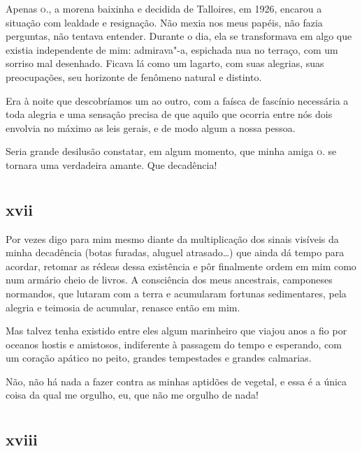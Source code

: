 Apenas \textsc{o.}, a morena baixinha e decidida de Talloires, em 1926, encarou a
situação com lealdade e resignação. Não mexia nos meus papéis, não fazia
perguntas, não tentava entender. Durante o dia, ela se transformava em
algo que existia independente de mim: admirava"-a, espichada nua no
terraço, com um sorriso mal desenhado. Ficava lá como um lagarto, com
suas alegrias, suas preocupações, seu horizonte de fenômeno natural e
distinto.

Era à noite que descobríamos um ao outro, com a faísca de fascínio
necessária a toda alegria e uma sensação precisa de que aquilo que
ocorria entre nós dois envolvia no máximo as leis gerais, e de modo
algum a nossa pessoa.

Seria grande desilusão constatar, em algum momento, que minha amiga
\textsc{o.} se tornara uma verdadeira amante. Que decadência!

\chapter*{}
\section{xvii}

\noindent{}Por vezes digo para mim mesmo diante da multiplicação dos
sinais visíveis da minha decadência (botas furadas, aluguel
atrasado\ldots{}) que ainda dá tempo para acordar, retomar as rédeas
dessa existência e pôr finalmente ordem em mim como num armário cheio de
livros. A consciência dos meus ancestrais, camponeses normandos, que
lutaram com a terra e acumularam fortunas sedimentares, pela alegria e
teimosia de acumular, renasce então em mim.

Mas talvez tenha existido entre eles algum marinheiro que viajou anos a
fio por oceanos hostis e amistosos, indiferente à passagem do tempo e
esperando, com um coração apático no peito, grandes tempestades e
grandes calmarias.

Não, não há nada a fazer contra as minhas aptidões de vegetal, e essa é
a única coisa da qual me orgulho, eu, que não me orgulho de nada!

\chapter*{}
\section{xviii}

